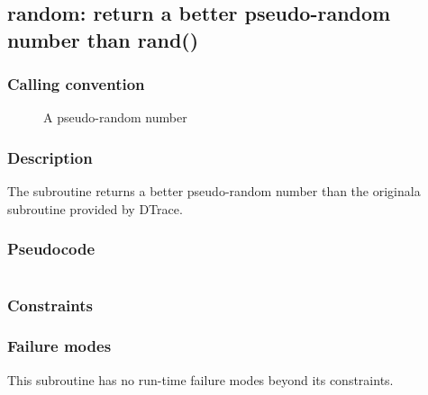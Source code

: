\clearpage
{}
{}
\label{insn:dummy}
\subsection*{random: return a better pseudo-random number than rand()}

\subsubsection*{Calling convention}

\begin{description}
\item[] A pseudo-random number
\end{description}

\subsubsection*{Description}

The  subroutine returns a better pseudo-random
number than the originala  subroutine provided by DTrace.
\subsubsection*{Pseudocode}

\begin{verbatim}
\end{verbatim}

\subsubsection*{Constraints}

\subsubsection*{Failure modes}

This subroutine has no run-time failure modes beyond its constraints.
